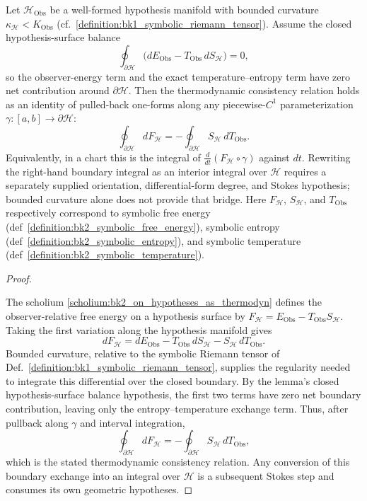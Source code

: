 \begin{lemma}
\label{lemma:bk2_thermodynamic_consistency_hypothesis_manifolds}
Let $\mathcal{H}_{\text{Obs}}$ be a well-formed hypothesis manifold with
bounded curvature $\kappa_{\mathcal{H}} < K_{\text{Obs}}$
(cf.~\ref{definition:bk1_symbolic_riemann_tensor}).  Assume the closed
hypothesis-surface balance
\[
\oint_{\partial\mathcal H}
\bigl(dE_{\text{Obs}}-T_{\text{Obs}}\,dS_{\mathcal H}\bigr)=0,
\]
so the observer-energy term and the exact temperature--entropy term have zero
net contribution around $\partial\mathcal H$.  Then the thermodynamic
consistency relation holds as an identity of pulled-back one-forms along any
piecewise-$C^1$ parameterization $\gamma:[a,b]\to\partial\mathcal H$:
\[
\oint_{\partial \mathcal{H}} dF_{\mathcal H}
= -\oint_{\partial\mathcal H} S_{\mathcal H}\,dT_{\text{Obs}}.
\]
Equivalently, in a chart this is the integral of
$\frac{d}{dt}(F_{\mathcal H}\circ\gamma)$ against $dt$.  Rewriting the
right-hand boundary integral as an interior integral over $\mathcal H$
requires a separately supplied orientation, differential-form degree, and
Stokes hypothesis; bounded curvature alone does not provide that bridge.
Here $F_{\mathcal{H}}$, $S_{\mathcal{H}}$, and $T_{\text{Obs}}$ respectively
correspond to symbolic free energy (def~\ref{definition:bk2_symbolic_free_energy}),
symbolic entropy (def~\ref{definition:bk2_symbolic_entropy}), and symbolic
temperature (def~\ref{definition:bk2_symbolic_temperature}).
\end{lemma}

\begin{proof}
\label{proof:bk2_thermodynamic_consistency_hypothesis_manifolds}
\leavevmode

The scholium \ref{scholium:bk2_on_hypotheses_as_thermodyn} defines the
observer-relative free energy on a hypothesis surface by
$F_{\mathcal H}=E_{\mathrm{Obs}}-T_{\mathrm{Obs}}S_{\mathcal H}$. Taking the
first variation along the hypothesis manifold gives
\[
dF_{\mathcal H}
  = dE_{\mathrm{Obs}}
    -T_{\mathrm{Obs}}\,dS_{\mathcal H}
    -S_{\mathcal H}\,dT_{\mathrm{Obs}} .
\]
Bounded curvature, relative to the symbolic Riemann tensor of
Def.~\ref{definition:bk1_symbolic_riemann_tensor}, supplies the regularity
needed to integrate this differential over the closed boundary. By the
lemma's closed hypothesis-surface balance hypothesis, the first two terms
have zero net boundary contribution, leaving only the entropy--temperature
exchange term. Thus, after pullback along $\gamma$ and interval integration,
\[
\oint_{\partial \mathcal{H}} dF_{\mathcal H}
  = -\oint_{\partial\mathcal H}S_{\mathcal H}\,dT_{\mathrm{Obs}},
\]
which is the stated thermodynamic consistency relation.  Any conversion of
this boundary exchange into an integral over $\mathcal H$ is a subsequent
Stokes step and consumes its own geometric hypotheses.
\end{proof}

